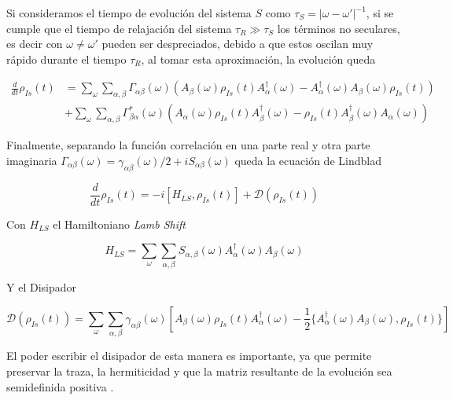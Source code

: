 Si consideramos el tiempo de evolución del sistema $S$ como $\tau_{S}=|\omega-\omega'|^{-1}$, si se cumple que el tiempo de relajación del sistema $\tau_{R}\gg \tau_{S}$ los términos no seculares, es decir con $\omega \neq \omega'$ pueden ser despreciados, debido a que estos oscilan muy rápido durante el tiempo $\tau_{R}$, al tomar esta aproximación, la evolución queda

\begin{align*}
    \frac{d}{dt}\rho_{Is}(t) & = \sum_{\omega}\sum_{\alpha,\beta} \Gamma_{\alpha \beta}(\omega)\left(A_{\beta}(\omega)\rho_{Is}(t)A^{\dagger}_{\alpha}(\omega) - A^{\dagger}_{\alpha}(\omega)A_{\beta}(\omega) \rho_{Is}(t) \right) \\
    & + \sum_{\omega}\sum_{\alpha,\beta} \Gamma^{*}_{\beta \alpha}(\omega) \left(A_{\alpha}(\omega)\rho_{Is}(t)A^{\dagger}_{\beta}(\omega) - \rho_{Is}(t)A^{\dagger}_{\beta}(\omega)A_{\alpha}(\omega) \right)
\end{align*}

Finalmente, separando la función correlación en una parte real y otra parte imaginaria $\Gamma_{\alpha \beta}(\omega) = \gamma_{\alpha \beta}(\omega)/2 + iS_{\alpha \beta}(\omega)$ queda la ecuación de Lindblad 

\begin{equation}
    \frac{d}{dt} \rho_{Is}(t) = -i[H_{LS},\rho_{Is}(t)] + \mathcal{D}(\rho_{Is}(t))
    \label{seclindbladfinal}
\end{equation}

Con $H_{LS}$ el Hamiltoniano \textit{Lamb Shift}

\begin{equation*}
    H_{LS} = \sum_{\omega} \sum_{\alpha,\beta} S_{\alpha,\beta}(\omega)A^{\dagger}_{\alpha}(\omega)A_{\beta}(\omega) 
\end{equation*}

Y el Disipador

\begin{equation*}
    \mathcal{D}(\rho_{Is}(t)) = \sum_{\omega}\sum_{\alpha,\beta} \gamma_{\alpha \beta}(\omega) \left[ A_{\beta}(\omega)\rho_{Is}(t)A^{\dagger}_{\alpha}(\omega) - \frac{1}{2}\{A^{\dagger}_{\alpha}(\omega)A_{\beta}(\omega), \rho_{Is}(t)  \} \right]
\end{equation*}

El poder escribir el disipador de esta manera es importante, ya que permite preservar la traza, la hermiticidad y que la matriz resultante de la evolución sea semidefinida positiva \cite{manzano2020short}.

